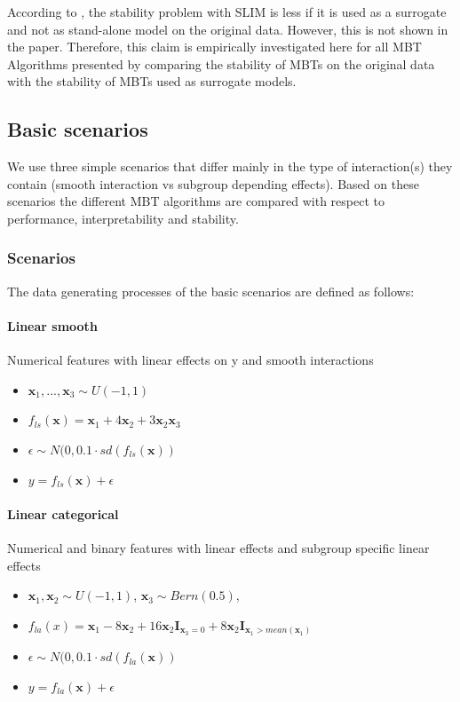According to \citep{Hu.2020}, the stability problem with SLIM is less if it is used as a surrogate and not as stand-alone model on the original data. However, this is not shown in the paper. Therefore, this claim is empirically investigated here for all MBT Algorithms presented by comparing the stability of MBTs on the original data with the stability of MBTs used as surrogate models.





\subsection{Basic scenarios}
We use three simple scenarios that differ mainly in the type of interaction(s) they contain (smooth interaction vs subgroup depending effects). Based on these scenarios the different MBT algorithms are compared with respect to performance, interpretability and stability.


\subsubsection{Scenarios}
The data generating processes of the basic scenarios are defined as follows:


\paragraph{Linear smooth}
Numerical features with linear effects on y and smooth interactions
\begin{itemize}
    \item $\textbf{x}_1,..., \textbf{x}_{3} \sim U(-1,1)$
    \item $ f_{ls}(\textbf{x}) = \textbf{x}_1 + 4   \textbf{x}_2 + 3   \textbf{x}_2   \textbf{x}_3 $
    \item $\epsilon \sim N(0, 0.1 \cdot sd(f_{ls}(\textbf{x}))$
    \item $y = f_{ls}(\textbf{x}) + \epsilon$
\end{itemize}             


\paragraph{Linear categorical}
Numerical and binary features with linear effects and subgroup specific linear effects
\begin{itemize}
    \item $\textbf{x}_1, \textbf{x}_2 \sim U(-1,1)$, $\textbf{x}_3 \sim Bern(0.5)$,  
    \item $ f_{la}(x) =  \textbf{x}_{1} - 8  \textbf{x}_2 + 16  \textbf{x}_2  \mathbf{I}_{\textbf{x}_3 = 0} + 8  \textbf{x}_2  \mathbf{I}_{\textbf{x}_1 > mean(\textbf{x}_1)} $
    \item $\epsilon \sim N(0, 0.1 \cdot sd(f_{la}(\textbf{x}))$
    \item $y = f_{la}(\textbf{x}) + \epsilon$          
\end{itemize}



